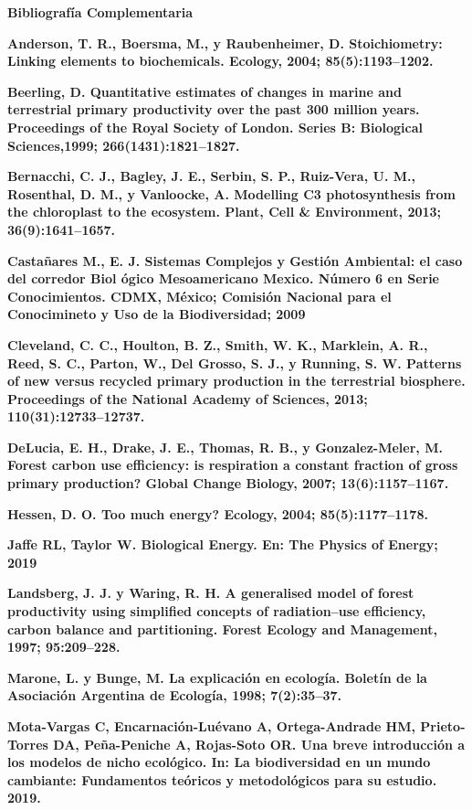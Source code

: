 \documentclass[
]{article}
\begin{document}
\textbf{\hfill\break
}

\textbf{Bibliografía Complementaria}

\textbf{Anderson, T. R., Boersma, M., y Raubenheimer, D. Stoichiometry:
Linking elements to biochemicals. Ecology, 2004; 85(5):1193--1202.}

\textbf{Beerling, D. Quantitative estimates of changes in marine and
terrestrial primary productivity over the past 300 million years.
Proceedings of the Royal Society of London. Series B: Biological
Sciences,1999; 266(1431):1821--1827.}

\textbf{Bernacchi, C. J., Bagley, J. E., Serbin, S. P., Ruiz-Vera, U.
M., Rosenthal, D. M., y Vanloocke, A. Modelling C3 photosynthesis from
the chloroplast to the ecosystem. Plant, Cell \& Environment, 2013;
36(9):1641--1657.}

\textbf{Castañares M., E. J. Sistemas Complejos y Gestión Ambiental: el
caso del corredor Biol ógico Mesoamericano Mexico. Número 6 en Serie
Conocimientos. CDMX, México; Comisión Nacional para el Conocimineto y
Uso de la Biodiversidad; 2009}

\textbf{Cleveland, C. C., Houlton, B. Z., Smith, W. K., Marklein, A. R.,
Reed, S. C., Parton, W., Del Grosso, S. J., y Running, S. W. Patterns of
new versus recycled primary production in the terrestrial biosphere.
Proceedings of the National Academy of Sciences, 2013;
110(31):12733--12737.}

\textbf{DeLucia, E. H., Drake, J. E., Thomas, R. B., y Gonzalez-Meler,
M. Forest carbon use efficiency: is respiration a constant fraction of
gross primary production? Global Change Biology, 2007;
13(6):1157--1167.}

\textbf{Hessen, D. O. Too much energy? Ecology, 2004; 85(5):1177--1178.}

\textbf{Jaffe RL, Taylor W. Biological Energy. En: The Physics of
Energy; 2019}

\textbf{Landsberg, J. J. y Waring, R. H. A generalised model of forest
productivity using simplified concepts of radiation--use efficiency,
carbon balance and partitioning. Forest Ecology and Management, 1997;
95:209--228.}

\textbf{Marone, L. y Bunge, M. La explicación en ecología. Boletín de la
Asociación Argentina de Ecología, 1998; 7(2):35--37.}

\textbf{Mota-Vargas C, Encarnación-Luévano A, Ortega-Andrade HM,
Prieto-Torres DA, Peña-Peniche A, Rojas-Soto OR. Una breve introducción
a los modelos de nicho ecológico. In: La biodiversidad en un mundo
cambiante: Fundamentos teóricos y metodológicos para su estudio. 2019.}
\end{document}
